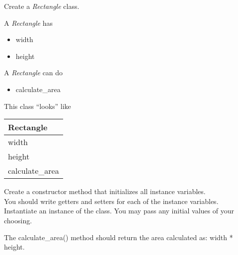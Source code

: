 
	\item Create a \textit{Rectangle} class.\\
	\begin{minipage}{.6\textwidth}
		A \textit{Rectangle} has
		\begin{itemize}
			\item width 
			\item height
		\end{itemize}

		A \textit{Rectangle} can do
		\begin{itemize}
			\item calculate\_area
		\end{itemize}
	\end{minipage}
	\begin{minipage}{.4\textwidth}
		This class ``looks'' like 
				
		\vspace*{1em}
		\begin{tabular}{|l|}
			\hline Rectangle\\ \hline
			width\\ height \\  \hline
			calculate\_area\\ \hline
		\end{tabular}
	\end{minipage}


	\vspace*{2ex}
	Create a constructor method that initializes all instance variables.\\
	You should write getters and setters for each of the instance variables.\\
	Instantiate an instance of the class. You may pass any initial values of your choosing.
	
	The calculate\_area() method should return the area calculated as: width * height.\\




